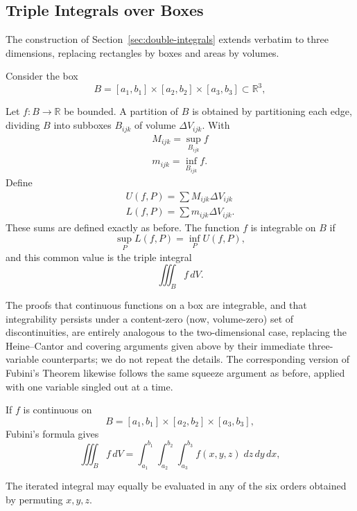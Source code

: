 \subsection{Triple Integrals over Boxes}

The construction of Section~\ref{sec:double-integrals} extends verbatim to three dimensions, replacing rectangles by boxes and areas by volumes.

\begin{definition}
Consider the box
\[
B = [a_1,b_1]\times[a_2,b_2]\times[a_3,b_3] \subset \mathbb{R}^3,
\]

Let $f : B \to \mathbb{R}$ be bounded. A partition of $B$ is obtained by partitioning each edge, dividing $B$ into subboxes $B_{ijk}$ of volume $\Delta V_{ijk}$. With
\[
\begin{gathered}
M_{ijk} = \sup_{B_{ijk}} f \\
m_{ijk} = \inf_{B_{ijk}} f.
\end{gathered}
\]
Define
\[
\begin{gathered}
U(f,P) = \sum M_{ijk}\Delta V_{ijk} \\
L(f,P) = \sum m_{ijk} \Delta V_{ijk}.
\end{gathered}
\]
These sums are defined exactly as before. The function $f$ is integrable on $B$ if
\[
\sup_P L(f,P) = \inf_P U(f,P),
\]
and this common value is the triple integral
\[
\iiint_B f\, dV.
\]

\end{definition}

The proofs that continuous functions on a box are integrable, and that integrability persists under a content-zero (now, volume-zero) set of discontinuities, are entirely analogous to the two-dimensional case, replacing the Heine--Cantor and covering arguments given above by their immediate three-variable counterparts; we do not repeat the details. The corresponding version of Fubini's Theorem likewise follows the same squeeze argument as before, applied with one variable singled out at a time.

\begin{theorem}
If $f$ is continuous on
\[
B = [a_1,b_1]\times[a_2,b_2]\times[a_3,b_3],
\]
Fubini's formula gives
\[
\iiint_B f\, dV = \int_{a_1}^{b_1}\int_{a_2}^{b_2}\int_{a_3}^{b_3} f(x,y,z)\; dz\, dy\, dx,
\]

The iterated integral may equally be evaluated in any of the six orders obtained by permuting $x,y,z$.
\end{theorem}

